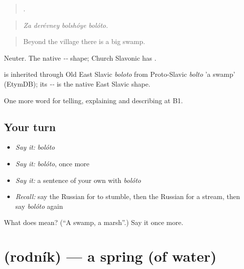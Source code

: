 \begin{quote}
   .
\end{quote}

\begin{quote}
\emph{Za derévney bolshóye bolóto.}
\end{quote}

\begin{quote}
Beyond the village there is a big swamp.
\end{quote}

Neuter. The native \emph{--} shape; Church Slavonic has \emph{}.

\begin{cousinweb}
\emph{} is inherited through Old East Slavic \emph{boloto} from Proto-Slavic \emph{bolto} 'a swamp' (EtymDB); its \emph{--} is the native East Slavic shape.
\end{cousinweb}

\begin{grammarlens}[title={What you've built}]
One more word for telling, explaining and describing at B1.
\end{grammarlens}

\subsection*{Your turn}
\begin{itemize}
\raggedright
  \item \emph{Say it:} \emph{bolóto}
  \item \emph{Say it:} \emph{bolóto}, once more
  \item \emph{Say it:} a sentence of your own with \emph{bolóto}
  \item \emph{Recall:} say the Russian for to stumble, then the Russian for a stream, then say \emph{bolóto} again
\end{itemize}

\begin{tcolorbox}[breakable,colback=teal!4,colframe=teal!35!black,title={Before you move on}]
What does  mean? (\textquotedblleft{}A swamp, a marsh\textquotedblright{}.) Say it once more.
\end{tcolorbox}
\section[\texorpdfstring{\ru{родник} (rodník)}{родник (rodník)}]{ (rodník) — a spring (of water)}


